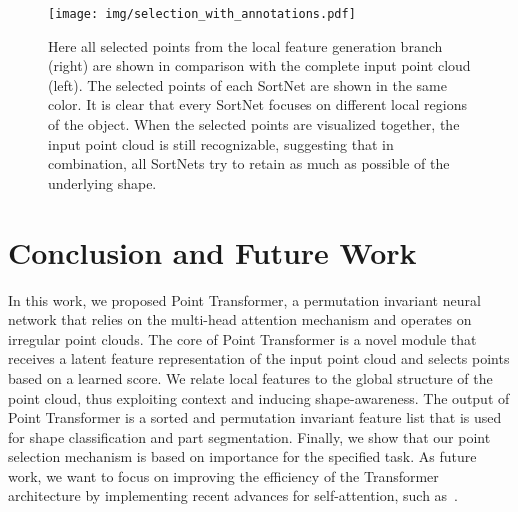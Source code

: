 \documentclass{ieeeaccess}
\begin{document}
\begin{figure*}[]
    \centering
    \texttt{[image: img/selection\_with\_annotations.pdf]}
    \caption{Here all selected points  from the local feature generation branch (right) are shown in comparison with the complete input point cloud (left). The selected points of each SortNet are shown in the same color. It is clear that every SortNet focuses on different local regions of the object. When the selected points are visualized together, the input point cloud is still recognizable, suggesting that in combination,  all SortNets try to retain as much as possible of the underlying shape.}
    \label{fig:selection}
\end{figure*}

\section{Conclusion and Future Work}\label{seq:06_conclusion}
In this work, we proposed Point Transformer, a permutation invariant neural network that relies on the multi-head attention mechanism and operates on irregular point clouds. The core of Point Transformer is a novel module that receives a latent feature representation of the input point cloud and selects points based on a learned score. We relate local features to the global structure of the point cloud, thus exploiting context and inducing shape-awareness. The output of Point Transformer is a sorted and permutation invariant feature list that is used for shape classification and part segmentation. Finally, we show that our point selection mechanism is based on importance for the specified task.
As future work, we want to focus on improving the efficiency of the Transformer architecture by implementing recent advances for self-attention, such as~\cite{wang2020linformer, xiong2021nystr}. 
\end{document}
